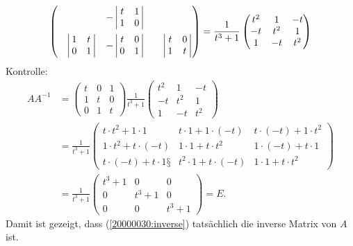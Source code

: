 \begin{loesung}
\begin{align}
\begin{pmatrix}
		&-\left|\,\begin{matrix}t&1\\1&0\end{matrix}\,\right|
			\\[11pt]
\phantom{-}\left|\,\begin{matrix}1&t\\0&1\end{matrix}\,\right|
	&-\left|\,\begin{matrix}t&0\\0&1\end{matrix}\,\right|
		&\phantom{-}\left|\,\begin{matrix}t&0\\1&t\end{matrix}\,\right|
\end{pmatrix}
=\frac1{t^3+1}
\renewcommand{\arraystretch}{1}
\begin{pmatrix}
t^2&  1& -t\\
 -t&t^2&  1\\
  1& -t&t^2
\end{pmatrix}
\label{20000030:inverse}
\end{align}
Kontrolle:
\begin{align*}
AA^{-1}
&=
\begin{pmatrix}
t&0&1\\
1&t&0\\
0&1&t
\end{pmatrix}
\frac{1}{t^3+1}
\begin{pmatrix}
t^2&  1& -t\\
 -t&t^2&  1\\
  1& -t&t^2
\end{pmatrix}
\\
&=
\frac{1}{t^3+1}
\begin{pmatrix}
t\cdot t^2+1\cdot 1
	&t\cdot 1+1\cdot(-t)
		&t\cdot(-t)+1\cdot t^2\\
1\cdot t^2+t\cdot (-t)
	&1\cdot 1+t\cdot t^2
		&1\cdot(-t)+t\cdot 1\\
t\cdot (-t)+t\cdot 1§
	&t^2\cdot 1+t\cdot (-t)
		&1\cdot 1+t\cdot t^2
\end{pmatrix}
\\
&=
\frac1{t^3+1}
\begin{pmatrix}
t^3+1&    0&    0\\
    0&t^3+1&    0\\
    0&    0&t^3+1
\end{pmatrix}=E.
\end{align*}
Damit ist gezeigt, dass (\ref{20000030:inverse}) tatsächlich die inverse Matrix
von $A$ ist.
\end{loesung}
